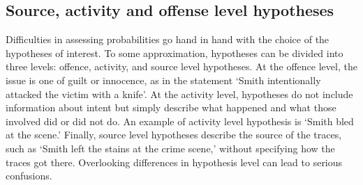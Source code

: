 \documentclass{article}
\begin{document}
\subsection{Source, activity and offense level hypotheses}
 \label{subsec:levels}



Difficulties in assessing  probabilities go hand in hand with the choice of the hypotheses of interest. To some approximation, hypotheses can be divided into three levels: offence, activity, and source level hypotheses. At the offence level, the issue is one of guilt or innocence, as in the statement `Smith intentionally attacked the victim with a knife'.  At the activity level, hypotheses 
do not include information about intent but simply describe what happened and what those involved did or did not do. An example of activity level hypothesis is `Smith bled at the scene.' Finally, source level hypotheses describe the source of the traces, such as  `Smith left the stains at the crime scene,' without specifying how the traces got there. Overlooking differences in hypothesis level can lead to serious confusions. 
\end{document}
